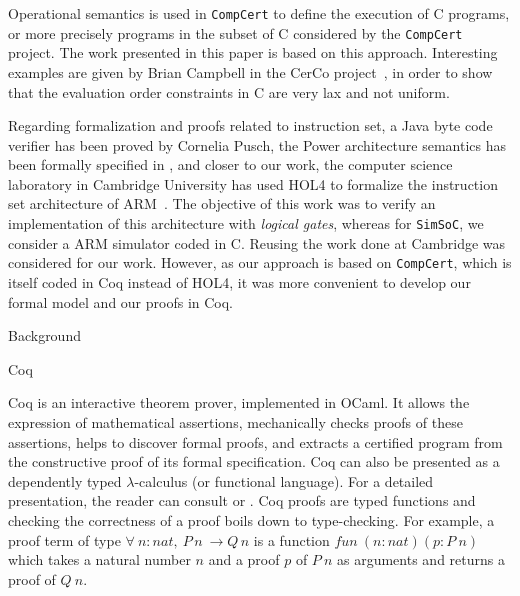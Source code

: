 \documentclass[twocolumn]{article}
\makeatletter
\def\section{\@startsection {section}{1}{\z@}{20pt plus 2pt minus 2pt}
{8pt plus 2pt minus 2pt}{\centering\normalsize\sc
\edef\@svsec{\thesection.\ }}}
\def\thesection{\Roman{section}}
\def\subsection{\@startsection {subsection}{2}{\z@}{16pt plus 2pt minus 2pt}
{6pt plus 2pt minus 2pt}{\normalsize\sl
\edef\@svsec{\thesubsection.\ }}}
\def\thesubsection{\Alph{subsection}}
\newcommand{\compcert}{\texttt{CompCert}\xspace}
\newcommand{\simsoc}{\texttt{SimSoC}\xspace}
\makeatother
\begin{document}
Operational semantics is used in \compcert to define the execution of
C programs, or more precisely programs in the subset of C considered
by the \compcert project.  The work presented in this paper is based
on this approach.  Interesting examples are given by Brian Campbell in
the CerCo project~\cite{campbell2012executable}, in order to show that
the evaluation order constraints in C are very lax and not uniform.

Regarding formalization and proofs related to instruction set, a Java
byte code verifier has been proved by Cornelia Pusch\cite{pusch-1999},
the Power architecture semantics has been formally specified in
\cite{alglave-2009}, and closer to our work, the computer science
laboratory in Cambridge University has used HOL4 to formalize the
instruction set architecture of ARM~\cite{FoxM10}. The
objective of this work was to verify an implementation of this
architecture with \emph{logical gates}, whereas for \simsoc, we
consider a ARM simulator coded in C.  Reusing the work done at Cambridge
was considered for our work.  However, as our approach is based on
\compcert, which is itself coded in Coq instead of HOL4, it was more
convenient to develop our formal model and our proofs in Coq.

\section{Background} %
\label{background}

\subsection{Coq}

Coq\cite{coqart} is an interactive theorem prover, implemented in
OCaml. It allows the expression of mathematical assertions,
mechanically checks proofs of these assertions, helps to discover
formal proofs, and extracts a certified program from the constructive
proof of its formal specification.  Coq can also be presented as a
dependently typed $\lambda$-calculus (or functional language).  For a
detailed presentation, the reader can consult \cite{coqmanual} or
\cite{coqart}.  Coq proofs are typed functions and checking the
correctness of a proof boils down to type-checking. For example, a
proof term of type $\forall~n: nat,~P\, n~\rightarrow Q\, n$ 
is a function $fun~(n:nat) (p:P\:n)$ which takes a
natural number $n$ and a proof $p$ of $P\:n$ as arguments and returns
a proof of $Q\:n$.
\end{document}
